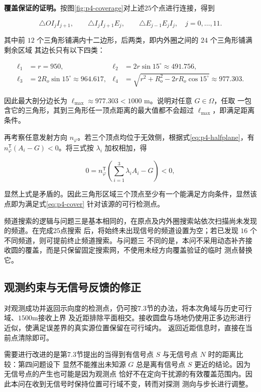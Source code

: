 \documentclass[withoutpreface,bwprint]{cumcmthesis} %
\begin{document}
\textbf{覆盖保证的证明。}按图\ref{fig:p4-coverage}对上述$25$个点进行连接，得到

\[
\triangle OI_jI_{j+1},\qquad
\triangle I_jI_{j+1}E_j,\qquad
\triangle E_{j-1}E_jI_j,\quad j=0,\ldots,11.
\]

其中前 $12$ 个三角形铺满内十二边形，后两类，即内外圈之间的 $24$ 个三角形铺满剩余区域
其边长只有以下四类：

\begin{equation}\label{eq:p4-edges}
\begin{aligned}
\ell_1&=r=950,&\ell_2&=2r\sin15^\circ\approx491.756,\\
\ell_3&=2R_o\sin15^\circ\approx964.617,&
\ell_4&=\sqrt{r^2+R_o^2-2rR_o\cos15^\circ}\approx977.303.
\end{aligned}
\end{equation}

因此最大剖分边长为 $\ell_{\max}\approx977.303<1000$ m。说明对任意 $G\in\Omega$，任取
一包含它的三角形，其到三角形任一顶点距离的最大值都不会超过 $\ell_{\max}$，即满足距离条件。

再考察任意发射方向 $n_\varphi$。若三个顶点均位于无效侧，根据式\eqref{eq:p4-halfplane}，有
$n_\varphi^{\mathsf T}(A_i-G)<0$。将三式按 $\lambda_i$ 加权相加，得

\[
0=n_\varphi^{\mathsf T}\!\left(\sum_{i=1}^3\lambda_iA_i-G\right)<0,
\]

显然上式是矛盾的。因此三角形区域三个顶点至少有一个能满足方向条件，显然该点即为满足式\eqref{eq:p4-cover}
针对该源的可行检测点。

频道搜索的逻辑与问题三是基本相同的，在原点及内外圈搜索站依次扫描尚未发现的频道。在完成25点搜索
后，将始终未出现信号的频道设置为空；若已发现 $16$ 个不同频道，则可提前终止频道搜索。与问题三
不同的是，本问不采用动态补齐接收圆的覆盖，而是只保留固定搜索网，不使用未经方向覆盖验证的临时
测点替换它。

\subsection{观测约束与无信号反馈的修正}

对观测成功并返回示向度的检测点，仍可按7.3节的办法，将本次角域与历史可行域、$1500$m接收上界
及近距排除平面相交。接收圆盘与场地仍使用正多边形进行近似，使满足误差界的真实源位置保留在可行域内。
返回近距信息时，直接在当前点清除即可。

需要进行改进的是第7.3节提出的当得到有信号点 $S$ 与无信号点 $N$ 时的距离比较：第四问题设下
显然不能推出未知源 $G$ 总是离有信号点 $S$ 更近的结论。因为无信号点的产生也可能是因为观测点
恰好不在定向干扰源的有效覆盖范围内。因此本问在收到无信号时保持位置可行域不变，转而对探测
测向与步长进行调整。
\end{document}
